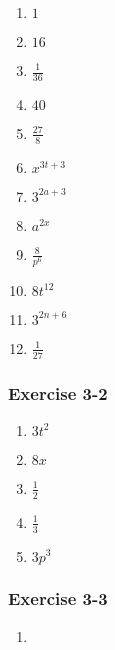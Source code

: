 {\begin{multicols}{3}

\begin{enumerate}[label=\textbf{\arabic*}.,itemsep=1pt]
 \item $1$%
 \item $16$%
 \item $\frac{1}{36}$%
 \item $40$%
 \item $\frac{27}{8}$%
 \item $x^{3t+3}$%
 \item $3^{2a+3}$%
 \item $a^{2x}$%
 \item $\frac{8}{p^6}$%
 \item $8t^{12}$%
 \item $3^{2n+6}$%
 \item $\frac{1}{27}$%
\end{enumerate}

\subsubsection*{Exercise 3-2} %


\begin{enumerate}[label=\textbf{\arabic*}.,itemsep=1pt]
 \item $3t^2$%
 \item $8x$%
 \item $\frac{1}{2}$%
 \item $\frac{1}{3}$%
 \item $3p^3$%
\end{enumerate}


\subsubsection*{Exercise 3-3} %

\begin{enumerate}[label=\textbf{\arabic*}.,itemsep=1pt]
\item %


\end{enumerate}
\end{multicols}}
